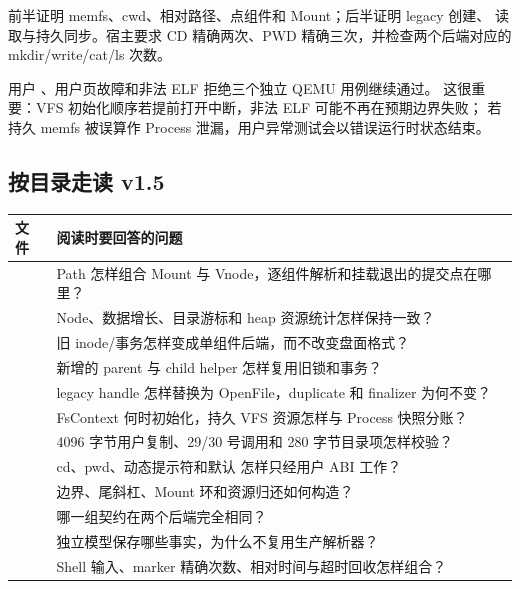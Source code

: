 前半证明 memfs、cwd、相对路径、点组件和 Mount；后半证明 legacy 创建、
读取与持久同步。宿主要求 CD 精确两次、PWD 精确三次，并检查两个后端对应的
mkdir/write/cat/ls 次数。

用户 、用户页故障和非法 ELF 拒绝三个独立 QEMU 用例继续通过。
这很重要：VFS 初始化顺序若提前打开中断，非法 ELF 可能不再在预期边界失败；
若持久 memfs 被误算作 Process 泄漏，用户异常测试会以错误运行时状态结束。

\subsection{按目录走读 v1.5}

\begin{longtable}{L{0.44\textwidth}L{0.44\textwidth}}
\toprule
文件 & 阅读时要回答的问题\\
\midrule
{} &
Path 怎样组合 Mount 与 Vnode，逐组件解析和挂载退出的提交点在哪里？\\
 &
Node、数据增长、目录游标和 heap 资源统计怎样保持一致？\\
 &
旧 inode/事务怎样变成单组件后端，而不改变盘面格式？\\
 &
新增的 parent 与 child helper 怎样复用旧锁和事务？\\
 &
legacy handle 怎样替换为 OpenFile，duplicate 和 finalizer 为何不变？\\
 &
FsContext 何时初始化，持久 VFS 资源怎样与 Process 快照分账？\\
 &
4096 字节用户复制、29/30 号调用和 280 字节目录项怎样校验？\\
 &
cd、pwd、动态提示符和默认  怎样只经用户 ABI 工作？\\
 &
边界、尾斜杠、Mount 环和资源归还如何构造？\\
 &
哪一组契约在两个后端完全相同？\\
 &
独立模型保存哪些事实，为什么不复用生产解析器？\\
 &
Shell 输入、marker 精确次数、相对时间与超时回收怎样组合？\\
\bottomrule
\end{longtable}

